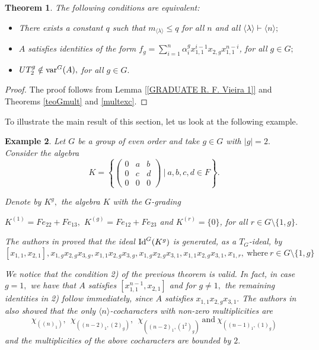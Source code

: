 \documentclass{amsart}
\newcommand{\var}{\ensuremath{\textnormal{var}}}
\newtheorem{teorema}{Theorem}[section]
\newtheorem{exemplo}[teorema]{Example}
\numberwithin{equation}{section}
\begin{document}
\begin{teorema}\label{[ GRADUADA R. F. Vieira]2}
 The following conditions are equivalent:
	\begin{itemize}
		\item[1)] There exists a constant $q$ such that $m_{\langle \lambda \rangle} \le q$ for all $n$ and all $\langle \lambda \rangle \vdash \langle n \rangle;$

\item[2)]  $A$ satisfies identities of the form	$f_g= \sum\limits_{i=1}^n \alpha_i^g x_{1,1}^{i-1} x_{2,g}x_{1,1}^{n-i}$, for all $g\in G;$ 
        
		\item[3)] $UT_2^{g}\notin \var^G(A),$ for all $g\in G.$

	\end{itemize}
	\end{teorema}


	\begin{proof} The proof follows from Lemma \ref{[GRADUATE R. F. Vieira 1]} and Theorems \ref{teoGmult} and \ref{multexc}.	
	\end{proof}

To illustrate the main result of this section, let us look at the following example.  

 \begin{exemplo}\label{ex3G} Let $G$ be a group of even order and take $g\in G$ with $|g|=2.$ Consider the algebra
$$K=\left\{\left(\begin{array}{ccc}
0 & a & b \\ 
0 & c & d \\
0 & 0 & 0
\end{array}\right) ~|~ a, b,c,d \in F \right\}.$$ 

Denote by $K^{g},$ the algebra $K$ with the $G$-grading  
\begin{center} $K^{(1)}=Fe_{22} + Fe_{13},$ $ K^{(g)}=Fe_{12}+Fe_{23}$ and $K^{(r)}=\{0\}$, for all $r \in G\setminus\{1,g\}.$
\end{center}

 The authors in \cite{CIMV}  proved that the ideal $\textnormal{Id}^G(K^{g})$ 
is generated, as a $T_G$-ideal, by $$ [x_{1,1},x_{2,1}], x_{1,g}x_{2,g}x_{3,g}, x_{1,1}x_{2,g}x_{3,g},x_{1,g}x_{2,g}x_{3,1}, x_{1,1}x_{2,g}x_{3,1}, x_{1,r}, \ \mbox{where} \ r\in G\setminus \{1,g\} $$

We notice that the condition 2) of the previous theorem is valid. In fact, in case $g=1,$ we have that $A$ satisfies $[x_{1,1}^{n-1}, x_{2,1}]$ and for $g \neq 1,$ the remaining identities in 2)  follow immediately, since $A$ satisfies $x_{1,1}x_{2,g}x_{3,1}.$  
 The authors in \cite{CIMV} also showed that the only  $\langle n \rangle$-cocharacters with non-zero multiplicities are 
$$\chi_{((n)_1)},~ ~ \chi_{((n-2)_1,(2)_g )},~ ~ \chi_{((n-2)_1,(1^2)_g )}~ \mbox{and} ~ \chi_{((n-1)_1,(1)_g)}$$
and the multiplicities of the above cocharacters are bounded by $2.$ 


\end{exemplo}
\end{document}
